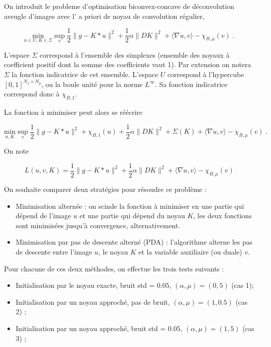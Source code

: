 \documentclass[a4paper]{article}
\begin{document}
On introduit le probleme d'optimisation biconvex-concave
de déconvolution aveugle d'images 
avec l' a priori de noyau de convolution régulier,

\[
\underset{u \in U ,K \in \Sigma}{\text{min}} \; \underset{v}{\text{sup}} \;
\frac{1}{2} \| g - K * u\|^2 
+ \frac{1}{2} \alpha \| D K \|^2
+ \langle \nabla u , v \rangle
- \chi_{B,\mu}(v)
\; .
\]

L'espace $\Sigma$ correspond à l'ensemble des simplexes 
(ensemble des noyaux à coefficient positif dont la somme des coefficients vaut 1).
Par extension on notera $\Sigma$ la fonction indicatrice de cet ensemble.
L'espace $U$ correspond à l'hypercube $[0,1]^{N_x \times N_y}$, ou la boule unité pour la norme $L^\infty$.
Sa fonction indicatrice correspond donc à $\chi_{B,1}$.

La fonction à minimiser peut alors se réécrire

\[
\underset{u ,K }{\text{min}} \; \underset{v}{\text{sup}} \;
\frac{1}{2} \| g - K * u\|^2 
+ \chi_{B,1} (u)
+ \frac{1}{2} \alpha \| D K \|^2
+ \Sigma(K)
+\langle \nabla u , v \rangle
- \chi_{B,\mu}(v)
\; .
\]

On note

\[
L(u,v,K)
 =\frac{1}{2} \| g - K * u\|^2 
+ \frac{1}{2} \alpha \| D K \|^2
+ \langle \nabla u , v \rangle
- \chi_{B,\mu}(v)
\]

On souhaite comparer deux stratégies pour résoudre ce problème :
\begin{itemize}
    \item Minimisation alternée : on scinde la fonction à minimiser en une partie qui dépend de l'image $u$ 
    et une partie qui dépend du noyau $K$, les deux fonctions sont minimisées jusqu'à convergence, alternativement.
    \item Minimisation par pas de descente alterné (PDA) : l'algorithme alterne les pas de descente entre l'image $u$, le noyau $K$ et la variable auxiliaire (ou duale) $v$.
\end{itemize}

Pour chacune de ces deux méthodes, on effectue les trois tests suivants :
\begin{itemize}
     \item Initialisation par le noyau exacte, bruit std = $0.05$, $(\alpha,\mu) = (0,5)$  (cas 1);
     \item Initialisation par un noyau approché, pas de bruit, $(\alpha,\mu) = (1,0.5)$  (cas 2) ;
      \item Initialisation par un noyau approché, bruit std = $0.05$, $(\alpha,\mu) = (1,5)$  (cas 3) ;
\end{itemize}
\end{document}
